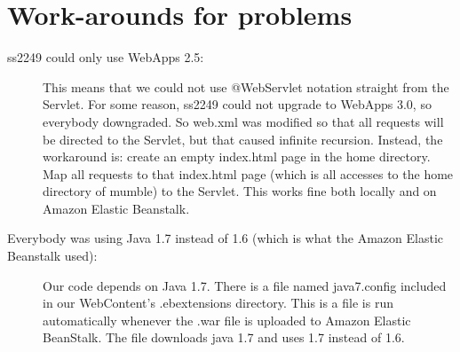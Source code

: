 \documentclass{article}
\begin{document}
\section{Work-arounds for problems}
  \begin{description}
    \item[ss2249 could only use WebApps 2.5:]
        This means that we could not use @WebServlet notation straight from the Servlet. For some reason, ss2249 could not upgrade to WebApps 3.0, so everybody downgraded. So web.xml was modified so that all requests will be directed to the Servlet, but that caused infinite recursion. Instead, the workaround is: create an empty index.html page in the home directory. Map all requests to that index.html page (which is all accesses to the home directory of mumble) to the Servlet. This works fine both locally and on Amazon Elastic Beanstalk.
    \item[Everybody was using Java 1.7 instead of 1.6 (which is what the Amazon Elastic Beanstalk used):]
        Our code depends on Java 1.7. There is a file named java7.config included in our WebContent's .ebextensions directory. This is a file is run automatically whenever the .war file is uploaded to Amazon Elastic BeanStalk. The file downloads java 1.7 and uses 1.7 instead of 1.6.\\
  \end{description}
\end{document}
